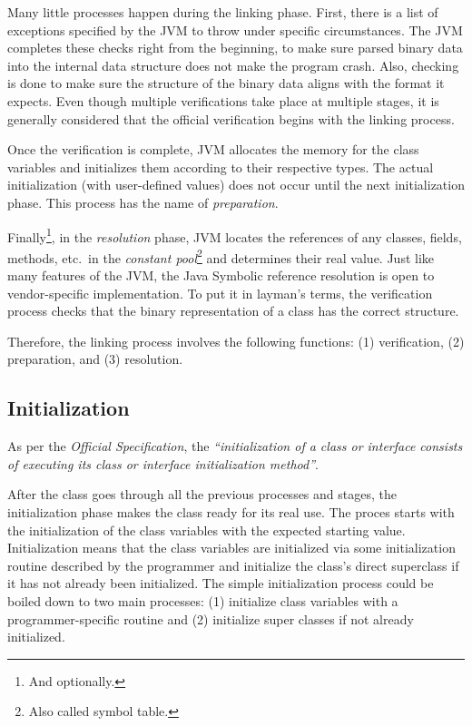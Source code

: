 \documentclass[english,runningheads,a4paper]{llncs}[2018/03/10]
\begin{document}
Many little processes happen during the linking phase. First, there is a list of
exceptions specified by the JVM to throw under specific circumstances. The JVM
completes these checks right from the beginning, to make sure parsed binary data
into the internal data structure does not make the program crash. Also, checking
is done to make sure the structure of the binary data aligns with the format it
expects. Even though multiple verifications take place at multiple stages, it is
generally considered that the official verification begins with the linking
process.

Once the verification is complete, JVM allocates the memory for the class
variables and initializes them according to their respective types. The actual
initialization (with user-defined values) does not occur until the next
initialization phase. This process has the name of \textit{preparation}.

Finally\footnote{And optionally.}, in the \textit{resolution} phase, JVM locates
the references of any classes, fields, methods, etc.\ in the \textit{constant
pool}\footnote{Also called symbol table.} and determines their real value. Just
like many features of the JVM, the Java Symbolic reference resolution is open to
vendor-specific implementation. To put it in layman's terms, the verification
process checks that the binary representation of a class has the correct
structure.

Therefore, the linking process involves the following functions: (1)
verification, (2) preparation, and (3) resolution.

\subsection*{Initialization}
As per the \textit{Official Specification}, the \textit{``initialization of a
class or interface consists of executing its class or interface initialization
method''}.

After the class goes through all the previous processes and stages, the
initialization phase makes the class ready for its real use. The proces starts
with the initialization of the class variables with the expected starting value.
Initialization means that the class variables are initialized via some
initialization routine described by the programmer and initialize the class's
direct superclass if it has not already been initialized. The simple
initialization process could be boiled down to two main processes: (1)
initialize class variables with a programmer-specific routine and (2) initialize
super classes if not already initialized.
\end{document}

